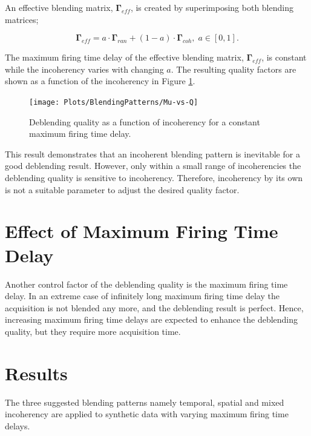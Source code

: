 An effective blending matrix, $\mathbf{\Gamma}_{eff}$, is created by superimposing both blending matrices;

\begin{equation}
	\mathbf{\Gamma}_{eff} = a \cdot \mathbf{\Gamma}_{ran} + (1 - a) \cdot \mathbf{\Gamma}_{coh}, \; a \in [0,1].
	\label{eq:Ch-Incoherency-EffectiveG}
\end{equation}


The maximum firing time delay of the effective blending matrix, $\mathbf{\Gamma}_{eff}$, is constant while the incoherency  varies with changing $a$. The resulting quality factors are shown as a function of the incoherency in Figure \ref{fig:Ch-Results-Quality-vs-Incoherency}.


\begin{figure}
	\centering
	\texttt{[image: Plots/BlendingPatterns/Mu-vs-Q]}
	\caption{Deblending quality as a function of incoherency for a constant maximum firing time delay.}
	\label{fig:Ch-Results-Quality-vs-Incoherency}
\end{figure}

This result demonstrates that an incoherent blending pattern is inevitable for a good deblending result. However, only within a small range of incoherencies the deblending quality is sensitive to incoherency. Therefore, incoherency by its own is not a suitable parameter to adjust the desired quality factor.


\section{Effect of Maximum Firing Time Delay}

Another control factor of the deblending quality is the maximum firing time delay. In an extreme case of infinitely long maximum firing time delay the acquisition is not blended any more, and the deblending result is perfect. Hence, increasing maximum firing time delays are expected to enhance the deblending quality, but they require more acquisition time.



\section{Results}

The three suggested blending patterns namely temporal, spatial and mixed incoherency are applied to synthetic data with varying maximum firing time delays. 

